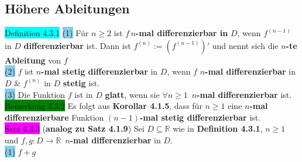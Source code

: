\documentclass[landscape, 10pt]{article}
\newcommand{\R}{\mathbb{R}}
\begin{document}
\begin{multicols}{3}
       \subsection{Höhere Ableitungen}
              \colorbox{cyan}{Definition 4.3.1} 
                     \colorbox{SkyBlue}{(1)} Für $n\geqslant2$ ist 
                            $f\,n$\textbf{-mal differenzierbar in} $D$, wenn 
                            \textcolor{NavyBlue}{$f^{(n-1)}$} in \textcolor{NavyBlue}{$D$}
                            \textbf{differenzierbar} ist. 
                            Dann ist \textcolor{NavyBlue}{$f^{(n)}:=(f^{(n-1)})'$} 
                            und nennt sich die $n$\textbf{-te Ableitung} von 
                            \textcolor{NavyBlue}{$f$}\\
                     \colorbox{SkyBlue}{(2)} \textcolor{NavyBlue}{$f$} 
                            ist $n$\textbf{-mal stetig differenzierbar} in 
                            \textcolor{NavyBlue}{$D$}, 
                            wenn \textcolor{NavyBlue}{$f$} 
                            \textbf{$n$-mal differenzierbar} in
                            \textcolor{NavyBlue}{$D$}
                            \& \textcolor{NavyBlue}{$f^{(n)}$} 
                            in \textcolor{NavyBlue}{$D$} \textbf{stetig} ist.\\
                     \colorbox{SkyBlue}{(3)} Die Funktion \textcolor{NavyBlue}{$f$} 
                            ist in \textcolor{NavyBlue}{$D$} \textbf{glatt}, wenn sie 
                            \textcolor{NavyBlue}{$\forall n\geqslant1$}\,
                            \textbf{$n$-mal differenzierbar} ist.\\
              \colorbox{green}{Bemerkung 4.3.2} 
                     Es folgt aus \textbf{Korollar 4.1.5}, dass für 
                     \textcolor{NavyBlue}{$n\geqslant1$} eine 
                     \textbf{$n$-mal differenzierbare}
                     Funktion \textbf{$(n-1)$-mal 
                     stetig differenzierbar} ist.\\
              \colorbox{magenta}{Satz 4.3.3} 
              (\textbf{analog zu Satz 4.1.9}) 
                     Sei \textcolor{NavyBlue}{$D\subseteq\R$} wie in 
                     \textbf{Definition 4.3.1}, 
                     \textcolor{NavyBlue}{$n\geqslant1$} und 
                     \textcolor{NavyBlue}{$f,g:D\longrightarrow\R$}\,
                     \textbf{$n$-mal 
                     differenzierbar} in \textcolor{NavyBlue}{$D$}.\\
                     \colorbox{SkyBlue}{(1)} \textcolor{NavyBlue}{$f+g$} 

\end{multicols}
\end{document}
